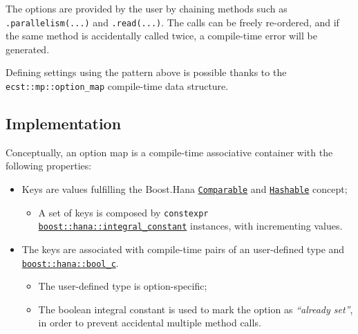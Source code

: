 \documentclass[oneside, 12pt, a4paper, openany]{book}
\providecommand{\tightlist}{%
  \setlength{\itemsep}{0pt}\setlength{\parskip}{0pt}}
\begin{document}
The options are provided by the user by chaining methods such as
\texttt{.parallelism(...)}
and
\texttt{.read(...)}.
The calls can be freely re-ordered, and if the same method is
accidentally called twice, a compile-time error will be generated.

Defining settings using the pattern above is possible thanks to the
\texttt{ecst::mp::option_map}
compile-time data structure.

\subsection{Implementation}\label{implementation-4}

Conceptually, an option map is a compile-time associative container with
the following properties:

\begin{itemize}
\item
  Keys are values fulfilling the Boost.Hana
  \href{http://www.boost.org/doc/libs/1_61_0/libs/hana/doc/html/group__group-Comparable.html}{\texttt{Comparable}}
  and
  \href{http://www.boost.org/doc/libs/1_61_0/libs/hana/doc/html/group__group-Hashable.html}{\texttt{Hashable}}
  concept;

  \begin{itemize}
  \tightlist
  \item
    A set of keys is composed by
    \texttt{constexpr}
    \href{http://www.boost.org/doc/libs/1_61_0/libs/hana/doc/html/structboost_1_1hana_1_1integral__constant.html}{\texttt{boost::hana::integral_constant}}
    instances, with incrementing values.
  \end{itemize}
\item
  The keys are associated with compile-time pairs of an user-defined
  type and
  \href{http://www.boost.org/doc/libs/1_61_0/libs/hana/doc/html/structboost_1_1hana_1_1integral__constant.html\#aa301b96de91d665fdc846bde4659b0d3}{\texttt{boost::hana::bool_c}}.

  \begin{itemize}
  \item
    The user-defined type is option-specific;
  \item
    The boolean integral constant is used to mark the option as
    \emph{``already set''}, in order to prevent accidental multiple
    method calls.
  \end{itemize}
\end{itemize}
\end{document}
